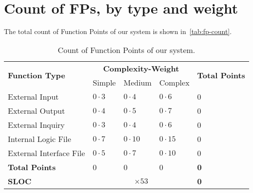 \section{Count of FPs, by type and weight}

The total count of Function Points of our system is shown in~\autoref{tab:fp-count}.
\begin{table}[h]
    \centering
    \begin{tabular}{| l | l | l | l | l |}
        \hline
        \multirow{2}{*}{\textbf{Function Type}} & \multicolumn{3}{c|}{\textbf{Complexity-Weight}} & \multirow{2}{*}{\textbf{Total Points}} \\
        \cline{2-4}
        & Simple & Medium & Complex & \\
        \hline
        External Input          & $0 \cdot 3$     & $0 \cdot 4$     & $0 \cdot 6$     & 0     \\
        External Output         & $0 \cdot 4$     & $0 \cdot 5$     & $0 \cdot 7$     & 0     \\
        External Inquiry        & $0 \cdot 3$     & $0 \cdot 4$     & $0 \cdot 6$     & 0     \\
        Internal Logic File     & $0 \cdot 7$     & $0 \cdot 10$    & $0 \cdot 15$    & 0     \\
        External Interface File & $0 \cdot 5$     & $0 \cdot 7$     & $0 \cdot 10$    & 0     \\
        \hline
        \textbf{Total Points} & 0 & 0 & 0 & \textbf{0} \\
        \hline
        \textbf{SLOC} & \multicolumn{3}{|c|}{$\times 53$} & \textbf{0}\\
        \hline
    \end{tabular}
    \caption{Count of Function Points of our system.}
    \label{tab:fp-count}
\end{table}
